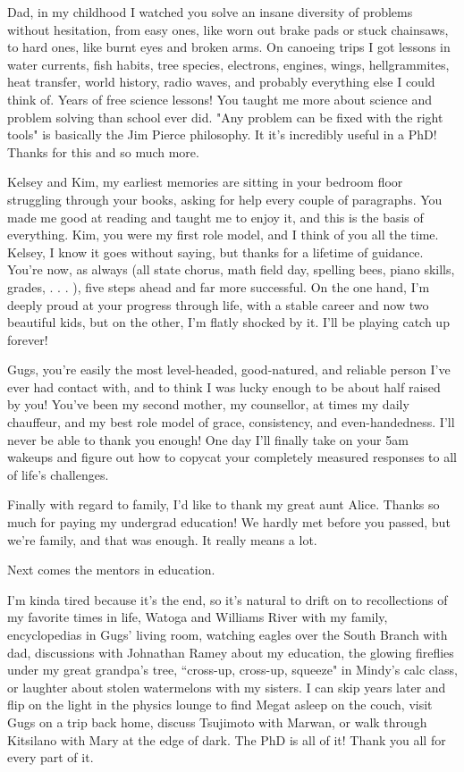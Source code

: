 Dad, in my childhood I watched you solve an insane diversity of problems without hesitation, from easy ones, like worn out brake pads or stuck chainsaws, to hard ones, like burnt eyes and broken arms.
On canoeing trips I got lessons in water currents, fish habits, tree species, electrons, engines, wings, hellgrammites, heat transfer, world history, radio waves, and probably everything else I could think of. Years of free science lessons! You taught me more about science and problem solving than school ever did. "Any problem can be fixed with the right tools" is basically the Jim Pierce philosophy. It it's incredibly useful in a PhD! Thanks for this and so much more.

Kelsey and Kim, my earliest memories are sitting in your bedroom floor struggling through your books, asking for help every couple of paragraphs. You made me good at reading and taught me to enjoy it, and this is the basis of everything. Kim, you were my first role model, and I think of you all the time. Kelsey, I know it goes without saying, but thanks for a lifetime of guidance. You're now, as always (all state chorus, math field day, spelling bees, piano skills, grades, . . . ), five steps ahead and far more successful. On the one hand, I'm deeply proud at your progress through life, with a stable career and now two beautiful kids, but on the other, I'm flatly shocked by it.
I'll be playing catch up forever!

Gugs, you're easily the most level-headed, good-natured, and reliable person I've ever had contact with, and to think I was lucky enough to be about half raised by you! You've been my second mother, my counsellor, at times my daily chauffeur, and my best role model of grace, consistency, and even-handedness. I'll never be able to thank you enough! One day I'll finally take on your 5am wakeups and figure out how to copycat your completely measured responses to all of life's challenges.

Finally with regard to family, I'd like to thank my great aunt Alice. Thanks so much for paying my undergrad education! We hardly met before you passed, but we're family, and that was enough. It really means a lot.

Next comes the mentors in education. 


I'm kinda tired because it's the end, so it's natural to drift on to recollections of my favorite times in life, Watoga and Williams River with my family, encyclopedias in Gugs' living room, watching eagles over the South Branch with dad, discussions with Johnathan Ramey about my education, the glowing fireflies under my great grandpa's tree, ``cross-up, cross-up, squeeze" in Mindy's calc class, or laughter about stolen watermelons with my sisters. I can skip years later and flip on the light in the physics lounge to find Megat asleep on the couch, visit Gugs on a trip back home, discuss Tsujimoto with Marwan, or walk through Kitsilano with Mary at the edge of dark. The PhD is all of it! Thank you all for every part of it.
